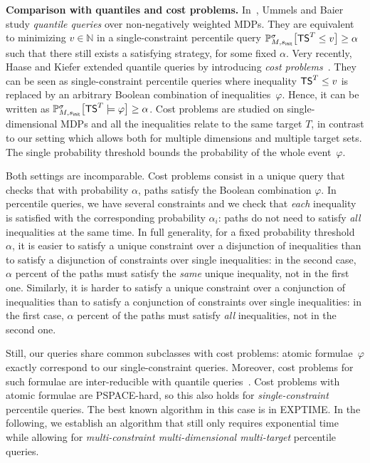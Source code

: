 \documentclass{llncs}
\newcommand{\initState}{\ensuremath{s_{{\sf init}}} }
\newcommand{\strat}{\ensuremath{\sigma} }
\newcommand*{\pr}{\mathbb{P}}
\newcommand{\truncatedTarget}{\ensuremath{T} }
\newcommand{\truncatedSum}[1]{\ensuremath{{\sf TS}^{#1}} }
\newcommand{\nat}{\ensuremath{\mathbb{N}} }
\newcommand\PSPACE{\textrm{\sf PSPACE}}
\newcommand\EXPTIME{\textrm{\sf EXPTIME}}
\begin{document}
\smallskip\noindent\textbf{Comparison with quantiles and cost problems.} In~\cite{DBLP:conf/fossacs/UmmelsB13}, Ummels and Baier study \textit{quantile queries} over non-negatively weighted MDPs. They are equivalent to minimizing $v \in \nat$ in a single-constraint percentile query $\pr_{M,\initState}^\strat\big[\truncatedSum{\truncatedTarget} \leq v\big] \geq
	\alpha$ such that there still exists a satisfying strategy, for some fixed $\alpha$. Very recently, Haase and Kiefer extended quantile queries by introducing \textit{cost problems}~\cite{HaaseK14}. They can be seen as single-constraint percentile queries where inequality $\truncatedSum{\truncatedTarget} \leq v$ is replaced by an arbitrary Boolean combination of inequalities~$\varphi$. Hence, it can be written as $\pr_{M,\initState}^\strat\big[\truncatedSum{\truncatedTarget}  \models \varphi\big] \geq
	\alpha$.
Cost problems are studied on single-dimensional MDPs and all the inequalities relate to the same target $\truncatedTarget$, in contrast to our setting which allows both for multiple dimensions and multiple target sets. The single probability threshold bounds the probability of the whole event~$\varphi$.
	
Both settings are incomparable. 
Cost problems consist in a unique query that checks that with probability $\alpha$, paths satisfy the Boolean combination $\varphi$. In percentile queries, we have several constraints and we check that \textit{each} inequality is satisfied with the corresponding probability $\alpha_{i}$: paths do not need to satisfy \textit{all} inequalities at the same time. In full generality, for a fixed probability threshold $\alpha$, it is easier to satisfy a unique constraint over a disjunction of inequalities than to satisfy a disjunction of constraints over single inequalities: in the second case, $\alpha$ percent of the paths must satisfy the \textit{same} unique inequality, not in the first one. Similarly, it is harder to satisfy a unique constraint over a conjunction of inequalities than to satisfy a conjunction of constraints over single inequalities: in the first case, $\alpha$ percent of the paths must satisfy \textit{all} inequalities, not in the second one.

Still, our queries share common subclasses with cost problems: atomic formulae~$\varphi$ exactly correspond to our single-constraint queries. Moreover, cost problems for such formulae are inter-reducible with quantile queries~\cite[Proposition 2]{HaaseK14}. Cost problems with atomic formulae are \PSPACE-hard, so this also holds for \textit{single-constraint} percentile queries. The best known algorithm in this case is in \EXPTIME. In the following, we establish an algorithm that still only requires exponential time while allowing for \textit{multi-constraint multi-dimensional multi-target} percentile queries.
\end{document}
